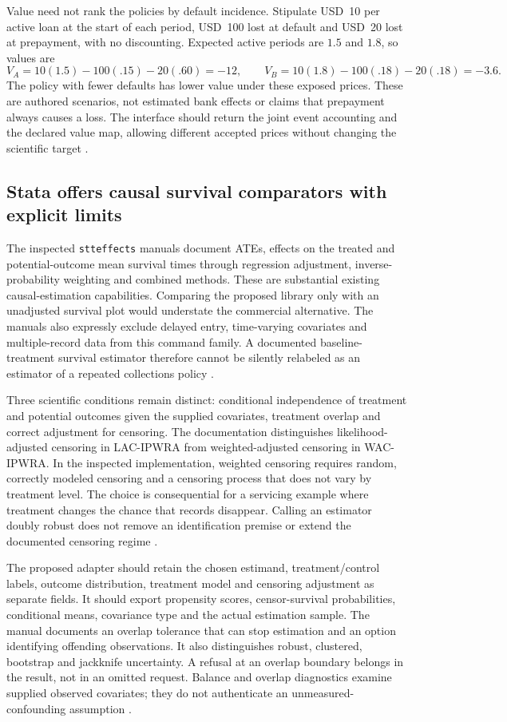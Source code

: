 Value need not rank the policies by default incidence. Stipulate USD~10 per
active loan at the start of each period, USD~100 lost at default and USD~20
lost at prepayment, with no discounting. Expected active periods are $1.5$
and $1.8$, so values are
\[
 V_A=10(1.5)-100(.15)-20(.60)=-12,\qquad
 V_B=10(1.8)-100(.18)-20(.18)=-3.6.
\]
The policy with fewer defaults has lower value under these exposed prices.
These are authored scenarios, not estimated bank effects or claims that
prepayment always causes a loss. The interface should return the joint event
accounting and the declared value map, allowing different accepted prices
without changing the scientific target \citep{exec14_survival_exact}.

\subsection{Stata offers causal survival comparators with explicit limits}

The inspected \texttt{stteffects} manuals document ATEs, effects on the treated
and potential-outcome mean survival times through regression adjustment,
inverse-probability weighting and combined methods. These are substantial
existing causal-estimation capabilities. Comparing the proposed library only
with an unadjusted survival plot would understate the commercial alternative.
The manuals also expressly exclude delayed entry, time-varying covariates and
multiple-record data from this command family. A documented baseline-treatment
survival estimator therefore cannot be silently relabeled as an estimator of
a repeated collections policy \citep{exec14_survival_stata}.

Three scientific conditions remain distinct: conditional independence of
treatment and potential outcomes given the supplied covariates, treatment
overlap and correct adjustment for censoring. The documentation distinguishes
likelihood-adjusted censoring in LAC-IPWRA from weighted-adjusted censoring
in WAC-IPWRA. In the inspected implementation, weighted censoring requires
random, correctly modeled censoring and a censoring process that does not
vary by treatment level. The choice is consequential for a servicing example
where treatment changes the chance that records disappear. Calling an
estimator doubly robust does not remove an identification premise or extend
the documented censoring regime \citep{exec14_survival_stata}.

The proposed adapter should retain the chosen estimand, treatment/control
labels, outcome distribution, treatment model and censoring adjustment as
separate fields. It should export propensity scores, censor-survival
probabilities, conditional means, covariance type and the actual estimation
sample. The manual documents an overlap tolerance that can stop estimation
and an option identifying offending observations. It also distinguishes
robust, clustered, bootstrap and jackknife uncertainty. A refusal at an
overlap boundary belongs in the result, not in an omitted request. Balance
and overlap diagnostics examine supplied observed covariates; they do not
authenticate an unmeasured-confounding assumption
\citep{exec14_survival_stata}.

